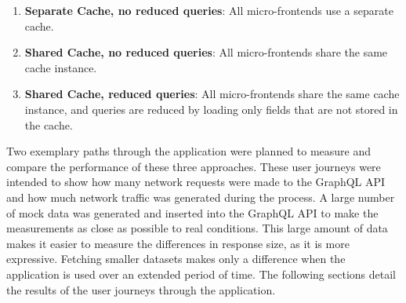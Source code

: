 \begin{enumerate}
  \item \textbf{Separate Cache, no reduced queries}: All micro-frontends use a separate cache.
  \item \textbf{Shared Cache, no reduced queries}: All micro-frontends share the same cache instance.
  \item \textbf{Shared Cache, reduced queries}: All micro-frontends share the same cache instance, and queries are reduced by loading only fields that are not stored in the cache.
\end{enumerate}

\noindent Two exemplary paths through the application were planned to measure and compare the performance of these three approaches. These user journeys were intended to show how many network requests were made to the GraphQL \ac{API} and how much network traffic was generated during the process. A large number of mock data was generated and inserted into the GraphQL \ac{API} to make the measurements as close as possible to real conditions. This large amount of data makes it easier to measure the differences in response size, as it is more expressive. Fetching smaller datasets makes only a difference when the application is used over an extended period of time. The following sections detail the results of the user journeys through the application.






